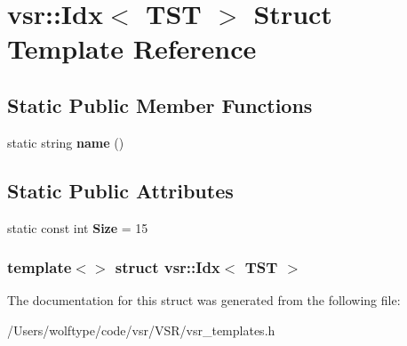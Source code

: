 \hypertarget{structvsr_1_1_idx_3_01_t_s_t_01_4}{\section{vsr\-:\-:Idx$<$ T\-S\-T $>$ Struct Template Reference}
\label{structvsr_1_1_idx_3_01_t_s_t_01_4}
}
\subsection*{Static Public Member Functions}
\begin{DoxyCompactItemize}
\item 
\hypertarget{structvsr_1_1_idx_3_01_t_s_t_01_4_a21db8cff9991ac964a5c37272e78f3f0}{static string {\bfseries name} ()}\label{structvsr_1_1_idx_3_01_t_s_t_01_4_a21db8cff9991ac964a5c37272e78f3f0}

\end{DoxyCompactItemize}
\subsection*{Static Public Attributes}
\begin{DoxyCompactItemize}
\item 
\hypertarget{structvsr_1_1_idx_3_01_t_s_t_01_4_abcee5736fdfccbe0a0cc099562bd9d36}{static const int {\bfseries Size} = 15}\label{structvsr_1_1_idx_3_01_t_s_t_01_4_abcee5736fdfccbe0a0cc099562bd9d36}

\end{DoxyCompactItemize}
\subsubsection*{template$<$$>$ struct vsr\-::\-Idx$<$ T\-S\-T $>$}



The documentation for this struct was generated from the following file\-:\begin{DoxyCompactItemize}
\item 
/\-Users/wolftype/code/vsr/\-V\-S\-R/vsr\-\_\-templates.\-h\end{DoxyCompactItemize}
